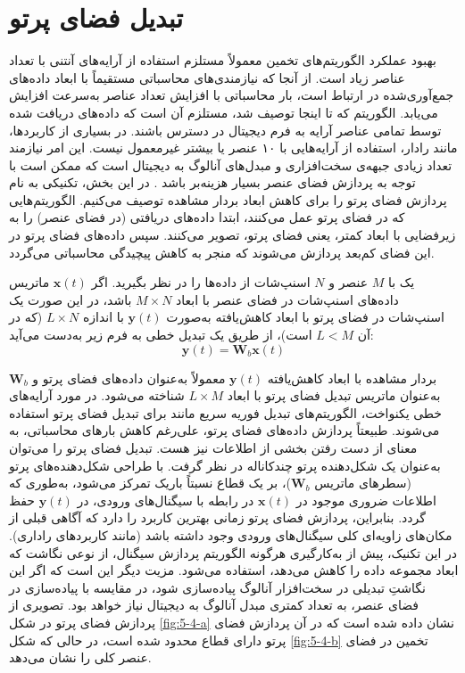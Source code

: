 \section{تبدیل فضای پرتو}
\label{sec:5-6}
بهبود عملکرد الگوریتم‌های تخمین  معمولاً مستلزم استفاده از آرایه‌های آنتنی با تعداد عناصر زیاد است. از آنجا که نیازمندی‌های محاسباتی مستقیماً با ابعاد داده‌های جمع‌آوری‌شده در ارتباط است، بار محاسباتی با افزایش تعداد عناصر به‌سرعت افزایش می‌یابد. الگوریتم  که تا اینجا توصیف شد، مستلزم آن است که داده‌های دریافت شده توسط تمامی عناصر آرایه به فرم دیجیتال در دسترس باشند. در بسیاری از کاربردها، مانند رادار، استفاده از آرایه‌هایی با ۱۰ عنصر یا بیشتر غیرمعمول نیست. این امر نیازمند تعداد زیادی جبهه‌ی سخت‌افزاری و مبدل‌های آنالوگ به دیجیتال است که ممکن است با توجه به پردازش فضای عنصر بسیار هزینه‌بر باشد \cite{5-10, 5-11}. در این بخش، تکنیکی به نام پردازش فضای پرتو را برای کاهش ابعاد بردار مشاهده توصیف می‌کنیم. الگوریتم‌هایی که در فضای پرتو عمل می‌کنند، ابتدا داده‌های دریافتی (در فضای عنصر) را به زیرفضایی با ابعاد کمتر، یعنی فضای پرتو، تصویر می‌کنند. سپس داده‌های فضای پرتو در این فضای کم‌بعد پردازش می‌شوند که منجر به کاهش پیچیدگی محاسباتی می‌گردد.

یک  با $M$ عنصر و $N$ اسنپ‌شات از داده‌ها را در نظر بگیرید. اگر $\bm{x}(t)$ ماتریس داده‌های اسنپ‌شات در فضای عنصر با ابعاد $M \times N$ باشد، در این صورت یک اسنپ‌شات در فضای پرتو با ابعاد کاهش‌یافته به‌صورت $\bm{y}(t)$ با اندازه $L \times N$ (که در آن $L < M$ است)، از طریق یک تبدیل خطی به فرم زیر به‌دست می‌آید:
\begin{equation*}
	\bm{y}(t) = \bm{W}_b \bm{x}(t)
\end{equation*}

بردار مشاهده با ابعاد کاهش‌یافته $\bm{y}(t)$ معمولاً به‌عنوان داده‌های فضای پرتو و $\bm{W}_b$ به‌عنوان ماتریس تبدیل فضای پرتو با ابعاد $L \times M$ شناخته می‌شود. در مورد آرایه‌های خطی یکنواخت، الگوریتم‌های تبدیل فوریه سریع مانند  برای تبدیل فضای پرتو استفاده می‌شوند. طبیعتاً پردازش داده‌های فضای پرتو، علی‌رغم کاهش بارهای محاسباتی، به معنای از دست رفتن بخشی از اطلاعات نیز هست. تبدیل فضای پرتو را می‌توان به‌عنوان یک شکل‌دهنده پرتو چندکاناله در نظر گرفت. با طراحی شکل‌دهنده‌های پرتو (سطرهای ماتریس $\bm{W}_b$)، بر یک قطاع  نسبتاً باریک تمرکز می‌شود، به‌طوری که اطلاعات ضروری موجود در $\bm{x}(t)$ در رابطه با سیگنال‌های ورودی، در $\bm{y}(t)$ حفظ گردد. بنابراین، پردازش فضای پرتو زمانی بهترین کاربرد را دارد که آگاهی قبلی از مکان‌های زاویه‌ای کلی سیگنال‌های ورودی وجود داشته باشد (مانند کاربردهای راداری). در این تکنیک، پیش از به‌کارگیری هرگونه الگوریتم پردازش  سیگنال، از نوعی نگاشت که ابعاد مجموعه داده را کاهش می‌دهد، استفاده می‌شود. مزیت دیگر این است که اگر این نگاشتِ تبدیلی در سخت‌افزار آنالوگ پیاده‌سازی شود، در مقایسه با پیاده‌سازی در فضای عنصر، به تعداد کمتری مبدل آنالوگ به دیجیتال نیاز خواهد بود. تصویری از پردازش فضای پرتو در شکل \ref{fig:5-4-a} نشان داده شده است که در آن پردازش فضای پرتو دارای قطاع  محدود شده است، در حالی که شکل \ref{fig:5-4-b} تخمین  در فضای عنصر کلی را نشان می‌دهد.

